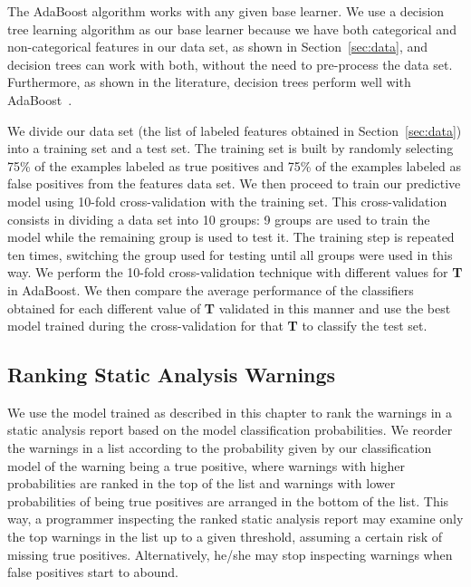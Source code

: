 The AdaBoost algorithm works with any given base learner. We use a decision
tree learning algorithm as our base learner because we have both categorical
and non-categorical features in our data set, as shown in
Section~\ref{sec:data}, and decision trees can work with both, without the need
to pre-process the data set. Furthermore, as shown in the literature, decision trees 
perform well with AdaBoost~\cite{drucker1996boosting}.

We divide our data set (the list of labeled features obtained in
Section~\ref{sec:data}) into a training set and a test set. The training set is
built by randomly selecting 75\% of the examples labeled as true positives and
75\% of the examples labeled as false positives from the features data set. We
then proceed to train our predictive model using 10-fold cross-validation
with the training set. This cross-validation consists in dividing a data set
into 10 groups: 9 groups are used to train the model while the remaining group is
used to test it. The training step is repeated ten times, switching the group
used for testing until all groups were used in this way.  We perform the
10-fold cross-validation technique with different values for \textbf{T} in
AdaBoost. We then compare the average performance of the classifiers obtained for
each different value of \textbf{T} validated in this manner and use the best
model trained during the cross-validation for that \textbf{T} to classify the
test set.

\subsection{Ranking Static Analysis Warnings}
\label{subsec:ranking}

We use the model trained as described in this chapter to rank the warnings in a
static analysis report based on the model classification probabilities. We
reorder the warnings in a list according to the probability given by our
classification model of the warning being a true positive, where warnings with
higher probabilities are ranked in the top of the list and warnings with lower
probabilities of being true positives are arranged in the bottom of the list.
This way, a programmer inspecting the ranked static analysis report may examine
only the top warnings in the list up to a given threshold, assuming a certain
risk of missing true positives. Alternatively, he/she may stop inspecting
warnings when false positives start to abound.
